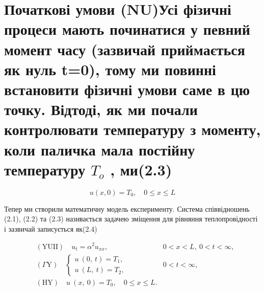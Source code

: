 \documentclass[
  ukrainian,
]{article}
\begin{document}
\section{\texorpdfstring{Початкові умови (NU)Усі фізичні процеси мають
починатися у певний момент часу (зазвичай приймається як нуль t=0), тому
ми повинні встановити фізичні умови саме в цю точку. Відтоді, як ми
почали контролювати температуру з моменту, коли паличка мала постійну
температуру \(T_{\mathrm{ }o}\) ,
ми(2.3)}{Початкові умови (NU)Усі фізичні процеси мають починатися у певний момент часу (зазвичай приймається як нуль t=0), тому ми повинні встановити фізичні умови саме в цю точку. Відтоді, як ми почали контролювати температуру з моменту, коли паличка мала постійну температуру T\_\{\textbackslash mathrm\{ \}o\} , ми(2.3)}}\label{ux43fux43eux447ux430ux442ux43aux43eux432ux456-ux443ux43cux43eux432ux438-nuux443ux441ux456-ux444ux456ux437ux438ux447ux43dux456-ux43fux440ux43eux446ux435ux441ux438-ux43cux430ux44eux442ux44c-ux43fux43eux447ux438ux43dux430ux442ux438ux441ux44f-ux443-ux43fux435ux432ux43dux438ux439-ux43cux43eux43cux435ux43dux442-ux447ux430ux441ux443-ux437ux430ux437ux432ux438ux447ux430ux439-ux43fux440ux438ux439ux43cux430ux454ux442ux44cux441ux44f-ux44fux43a-ux43dux443ux43bux44c-t0-ux442ux43eux43cux443-ux43cux438-ux43fux43eux432ux438ux43dux43dux456-ux432ux441ux442ux430ux43dux43eux432ux438ux442ux438-ux444ux456ux437ux438ux447ux43dux456-ux443ux43cux43eux432ux438-ux441ux430ux43cux435-ux432-ux446ux44e-ux442ux43eux447ux43aux443.-ux432ux456ux434ux442ux43eux434ux456-ux44fux43a-ux43cux438-ux43fux43eux447ux430ux43bux438-ux43aux43eux43dux442ux440ux43eux43bux44eux432ux430ux442ux438-ux442ux435ux43cux43fux435ux440ux430ux442ux443ux440ux443-ux437-ux43cux43eux43cux435ux43dux442ux443-ux43aux43eux43bux438-ux43fux430ux43bux438ux447ux43aux430-ux43cux430ux43bux430-ux43fux43eux441ux442ux456ux439ux43dux443-ux442ux435ux43cux43fux435ux440ux430ux442ux443ux440ux443-t_mathrm-o-ux43cux4382.3}

\[
u(x, 0) = T_0, \quad 0 \le x \le L
\]

Тепер ми створили математичну модель експерименту. Система співвідношень
(2.1), (2.2) та (2.3) називається задачею зміщення для рівняння
теплопровідності і зазвичай записується як(2.4)

\[
\begin{aligned} & (\text{YUII}) \quad u_t = \alpha^2 u_{xx}, & 0 < x < L, \ 0 < t < \infty, \\ & \left( \Gamma \text{Y} \right) \quad \begin{cases} u \ (0, \ t) = T_1, \\ u \ (L, \ t) = T_2, \end{cases} & 0 < t < \infty, \\ & (\text{HY}) \quad u \ (x, \ 0) = T_0, \quad 0 \leqslant x \leqslant L. \end{aligned}
\]
\end{document}

